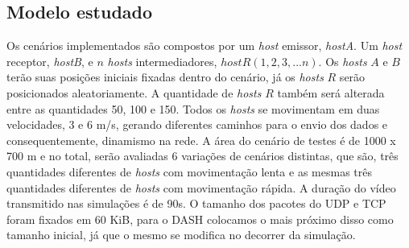 \documentclass[12pt]{article}
\begin{document}
\subsection{Modelo estudado}
	Os cenários implementados são compostos por um \textit{host} emissor, \textit{hostA}. Um \textit{host} receptor, \textit{hostB}, e $n$ \textit{hosts} intermediadores, $hostR (1,2,3, ... n)$. Os \textit{hosts} $A$ e $B$ terão suas posições iniciais fixadas dentro do cenário, já os \textit{hosts} $R$ serão posicionados aleatoriamente. A quantidade de \textit{hosts} $R$ também será alterada entre as quantidades 50, 100 e 150. Todos os \textit{hosts} se movimentam em duas velocidades, 3 e 6 m/s, gerando diferentes caminhos para o envio dos dados e consequentemente, dinamismo na rede. A área do cenário de testes é de 1000 x 700 m e no total, serão avaliadas 6 variações de cenários distintas, que são, três quantidades diferentes de \textit{hosts} com movimentação lenta e as mesmas três quantidades diferentes de \textit{hosts} com movimentação rápida. A duração do vídeo transmitido nas simulações é de 90s. O tamanho dos pacotes do UDP e TCP foram fixados em 60 KiB, para o DASH colocamos o mais próximo disso como tamanho inicial, já que o mesmo se modifica no decorrer da simulação.%


\end{document}
